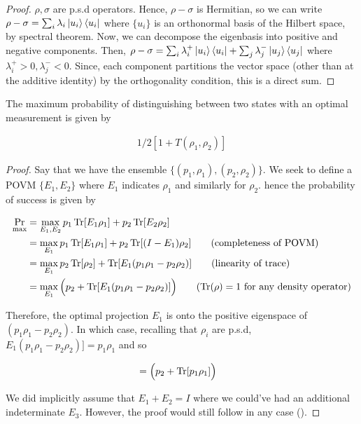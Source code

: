 \documentclass[main.tex]{subfiles}
\begin{document}
\begin{subappendices}
\begin{proof}
$\rho, \sigma$ are p.s.d operators. Hence, $\rho - \sigma$ is Hermitian, so we can write $\rho - \sigma = \sum_i \lambda_i \ket{u_i}\bra{u_i}$ where $\{ u_i \}$ is an orthonormal basis of the Hilbert space, by spectral theorem. Now, we can decompose the eigenbasis into positive and negative components. Then, $\rho - \sigma = \sum_i \lambda^+_i \ket{u_i}\bra{u_i} + \sum_j \lambda^-_j\ket{u_j}\bra{u_j}$ where $\lambda^+_i >0, \lambda^-_j < 0$. Since, each component partitions the vector space (other than at the additive identity) by the orthogonality condition, this is a direct sum.
\end{proof}


\begin{lemma}
The maximum probability of distinguishing between two states with an optimal measurement is given by

\begin{align*}
	1/2[1 + T(\rho_1, \rho_2)]
\end{align*}
	
\end{lemma}
\begin{proof}
Say that we have the ensemble $\{ (p_1, \rho_1), (p_2, \rho_2)\}$. We seek to define a POVM $\{E_1, E_2 \}$ where $E_1$ indicates $\rho_1$ and similarly for $\rho_2$. hence the probability of success is given by

\begin{align*}
\Pr_{\max} &= \max_{E_1, E_2}p_1\Tr[E_1\rho_1] + p_2\Tr[E_2\rho_2] \\
&= \max_{E_1} p_1\Tr[E_1\rho_1] + p_2\Tr[(I - E_1)\rho_2] \tag{completeness of POVM} \\
&= \max_{E_1}p_2\Tr[\rho_2] + \Tr[E_1(p_1\rho_1 - p_2\rho_2)] \tag{linearity of trace} \\
&= \max_{E_1} \Big( p_2 + \Tr[E_1(p_1\rho_1 - p_2\rho_2)]\Big) \tag{$\Tr(\rho) = 1$ for any density operator}
\end{align*}

Therefore, the optimal projection $E_1$ is onto the positive eigenspace of $(p_1\rho_1 - p_2\rho_2)$. In which case, recalling that $\rho_i$ are p.s.d, $E_1(p_1\rho_1 - p_2\rho_2)] = p_1 \rho_1$ and so

\begin{align*}
&= 	\Big( p_2 + \Tr[p_1\rho_1]\Big)
\end{align*}
 
	
We did implicitly assume that $E_1 + E_2 = I$ where we could've had an additional indeterminate $E_3$. However, the proof would still follow in any case (\cite{nielsen2010quantum}).
\end{proof}



\end{subappendices}
\end{document}
